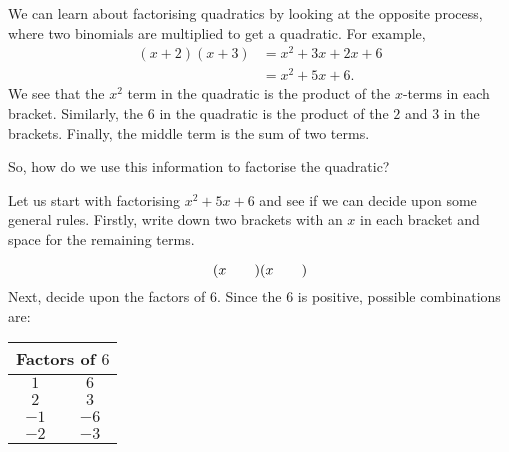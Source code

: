 We can learn about factorising quadratics by looking at the opposite
process, where two binomials are multiplied to get a quadratic. For
example,
\begin{align*}
  (x+2)(x+3) &= x^2+3x+2x+6 \\
  &= {x}^{2}+5x+6.
\end{align*}
We see that the ${x}^{2}$ term in the quadratic is the product of the $x$-terms in each bracket. Similarly, the $6$ in the quadratic is the product of the $2$ and $3$ in the brackets. Finally, the middle term is the sum of two terms.\par 
So, how do we use this information to factorise the quadratic?\par 
Let us start with factorising ${x}^{2}+5x+6$ and see if we can decide upon some general rules. Firstly, write down two brackets with an $x$ in each bracket and space for the remaining terms.\par 
\begin{equation*}
(x\phantom{\rule{2.em}{0ex}})(x\phantom{\rule{2.em}{0ex}})
\end{equation*}
Next, decide upon the factors of $6$. Since the $6$ is positive, possible combinations are:\par 
\begin{table}[H]
\begin{center}
\begin{tabular}[t]{|c|c|}\hline
\multicolumn{2}{|c|}{\textbf{Factors of $6$}}
\\ \hline
$1$ &
$6$%
\\ \hline
$2$ &
$3$%
\\ \hline
$-1$ &
$-6$%
\\ \hline
$-2$ &
$-3$%
\\ \hline
\end{tabular}
\end{center}
\end{table}

